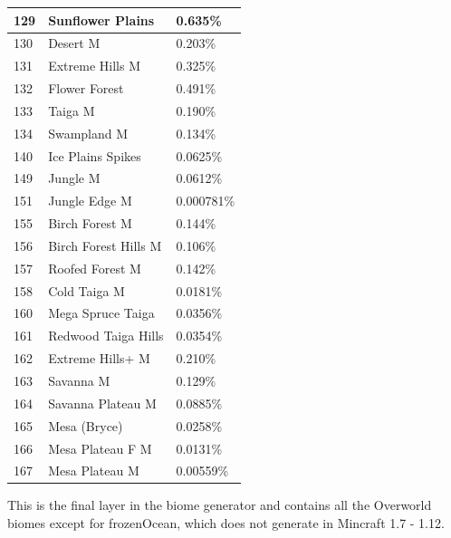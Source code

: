 \documentclass{article}
\begin{document}
	\begin{tabular}{|l|l|l|}\hline
		129    & Sunflower Plains     & 0.635\%\\\hline
		130    & Desert M             & 0.203\%\\\hline
		131    & Extreme Hills M      & 0.325\%\\\hline
		132    & Flower Forest        & 0.491\%\\\hline
		133    & Taiga M              & 0.190\%\\\hline
		134    & Swampland M          & 0.134\%\\\hline
		140    & Ice Plains Spikes    & 0.0625\%\\\hline
		149    & Jungle M             & 0.0612\%\\\hline
		151    & Jungle Edge M        & 0.000781\%\\\hline
		155    & Birch Forest M       & 0.144\%\\\hline
		156    & Birch Forest Hills M & 0.106\%\\\hline
		157    & Roofed Forest M      & 0.142\%\\\hline
		158    & Cold Taiga M         & 0.0181\%\\\hline
		160    & Mega Spruce Taiga    & 0.0356\%\\\hline
		161    & Redwood Taiga Hills  & 0.0354\%\\\hline
		162    & Extreme Hills+ M     & 0.210\%\\\hline
		163    & Savanna M            & 0.129\%\\\hline
		164    & Savanna Plateau M    & 0.0885\%\\\hline
		165    & Mesa (Bryce)         & 0.0258\%\\\hline
		166    & Mesa Plateau F M     & 0.0131\%\\\hline
		167    & Mesa Plateau M       & 0.00559\%\\\hline
	\end{tabular}

	\medskip\noindent
	This is the final layer in the biome generator and contains all the Overworld biomes except for frozenOcean, which does not generate in Mincraft 1.7 - 1.12.
\end{document}
